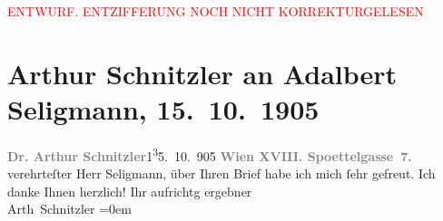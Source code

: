 
\begin{center}
            \textcolor{red}{ENTWURF. ENTZIFFERUNG NOCH NICHT KORREKTURGELESEN}
                      \end{center}
            
               \section[Arthur Schnitzler an Adalbert Seligmann, 15. 10. 1905]{ Arthur Schnitzler an Adalbert Seligmann,
                    15. 10. 1905}\nopagebreak{}\rehead{ }\begin{ledgroupsized}[t]{13cm}\normalsize\beginnumbering{} \toendnotes[C]{\smallbreak\pagebreak[2]} 
\pstart
           \noindent{}{\pb}\textcolor{gray}{\textbf{Dr. Arthur Schnitzler}}\hfill 1\substVorne{}\textsuperscript{3}\substDazwischen{}5\substHinten{}. 10. 905\pend
           \pstart
           \textcolor{gray}{\textbf{Wien XVIII.
                                Spoettelgasse 7.}}\pend
           \pstart
           verehrteſter Herr Seligmann, über Ihren Brief habe ich mich ſehr
                    gefreut. Ich danke Ihnen herzlich!\pend
           \pstart
           Ihr aufrichtg ergebner{\\[\baselineskip]}\spacefill\mbox{Arth Schnitzler}\pend
           \leftskip=0em{}\endnumbering{}\end{ledgroupsized}  \newcommand{\dateiname}{L01564}\newcommand{\titel}{Arthur Schnitzler an Adalbert Seligmann, 15. 10. 1905}\newcommand{\editorInnen}{Martin Anton Müller und Gerd-Hermann Susen}
      